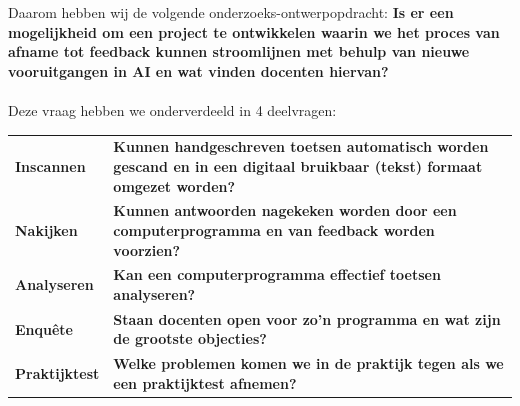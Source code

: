 \documentclass[12pt]{article}
\begin{document}
\begin{multicols}{2}
Daarom hebben wij de volgende onderzoeks-ontwerpopdracht: %
\textbf{Is er een mogelijkheid om een project te ontwikkelen waarin we het proces van afname tot feedback kunnen stroomlijnen met behulp van nieuwe vooruitgangen in AI en wat vinden docenten hiervan?}
\\\\
Deze vraag hebben we onderverdeeld in 4 deelvragen:\\
\begin{tabularx}{\linewidth}{lX}
    \vspace{0.2cm}
   \textbf{Inscannen } & \textbf{Kunnen handgeschreven toetsen automatisch worden gescand en in een digitaal bruikbaar (tekst) formaat omgezet worden?} \\
   \vspace{0.2cm}
   \textbf{Nakijken } & \textbf{Kunnen antwoorden nagekeken worden door een computerprogramma en van feedback worden voorzien?} \\
   \vspace{0.2cm}
   \textbf{Analyseren } & \textbf{Kan een computerprogramma effectief toetsen analyseren?} \\
   \vspace{0.2cm}
   \textbf{Enquête } & \textbf{Staan docenten open voor zo'n programma en wat zijn de grootste objecties? } \\
   \vspace{0.2cm}
   \textbf{Praktijktest } & \textbf{Welke problemen komen we in de praktijk tegen als we een praktijktest afnemen? } \\
\end{tabularx}

\end{multicols}
\pagebreak
\end{document}
